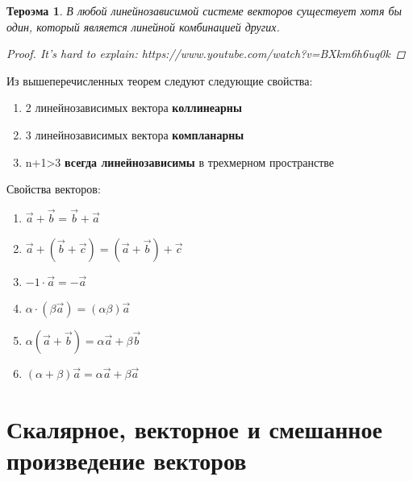 \documentclass[oneside]{book}
\newtheorem{thm}{Тероэма}[chapter] %
\begin{document}
\begin{enumerate}
\begin{itemize}
\begin{enumerate}
\begin{thm}
  В любой линейнозависимой системе векторов существует хотя бы один, который является линейной комбинацией других.
  \begin{proof}
    It's hard to explain: https://www.youtube.com/watch?v=BXkm6h6uq0k
  \end{proof}
\end{thm}
Из вышеперечисленных теорем следуют следующие свойства:
\begin{enumerate}
  \item 2 линейнозависимых вектора \textbf{коллинеарны}
  \item 3 линейнозависимых вектора \textbf{компланарны} 
  \item n+1>3 \textbf{всегда линейнозависимы} в трехмерном пространстве
  \end{enumerate}
Свойства векторов:
\begin{enumerate}
  \item $\vec{a}+\vec{b}=\vec{b}+\vec{a}$
  \item $\vec{a}+(\vec{b}+\vec{c})=(\vec{a}+\vec{b})+\vec{c}$
  \item $-1\cdot\vec{a}=-\vec{a}$
  \item $\alpha\cdot(\beta\vec{a})=(\alpha\beta)\vec{a}$
  \item $\alpha(\vec{a}+\vec{b})=\alpha\vec{a}+\beta\vec{b}$
  \item $(\alpha+\beta)\vec{a}=\alpha\vec{a}+\beta\vec{a}$
\end{enumerate}

\setcounter{chapter}{41}
\chapter{Скалярное, векторное и смешанное произведение векторов}

\end{enumerate}
\end{itemize}
\end{enumerate}
\end{document}
